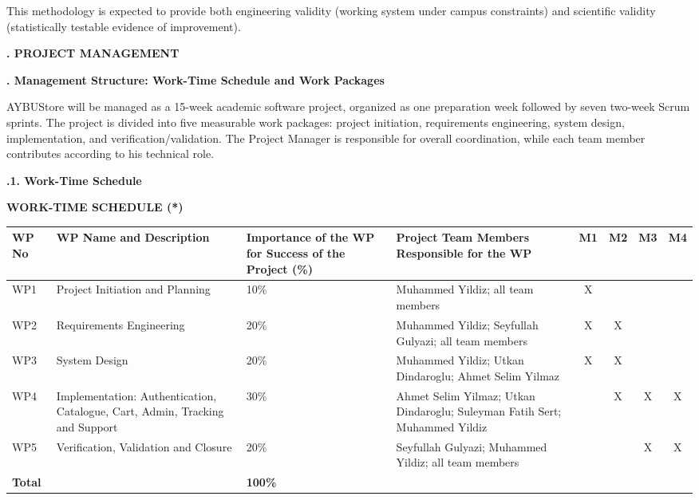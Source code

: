 \documentclass[10pt,a4paper]{article}
\newcommand{\sectionlabel}[1]{\vspace{1.2em}\noindent\textbf{\fontsize{10.5}{12}\selectfont #1}\par\vspace{0.4em}}
\newcommand{\subhead}[1]{\vspace{0.8em}\noindent\textbf{\fontsize{10}{11}\selectfont #1}\par\vspace{0.3em}}
\begin{document}
This methodology is expected to provide both engineering validity (working system under campus constraints) and scientific validity (statistically testable evidence of improvement).

\clearpage

\sectionlabel{3. PROJECT MANAGEMENT}

\subhead{3.1. Management Structure: Work-Time Schedule and Work Packages}

AYBUStore will be managed as a 15-week academic software project, organized as one preparation week followed by seven two-week Scrum sprints. The project is divided into five measurable work packages: project initiation, requirements engineering, system design, implementation, and verification/validation. The Project Manager is responsible for overall coordination, while each team member contributes according to his technical role.

\subhead{3.1.1. Work-Time Schedule}

\begin{center}
\textbf{WORK-TIME SCHEDULE (*)}
\end{center}

\scriptsize
\begin{tabularx}{\textwidth}{|P{0.07\textwidth}|P{0.23\textwidth}|P{0.13\textwidth}|P{0.27\textwidth}|C|C|C|C|}
\hline
\textbf{WP No} &
\textbf{WP Name and Description} &
\textbf{Importance of the WP for Success of the Project (\%)} &
\textbf{Project Team Members Responsible for the WP} &
\textbf{M1} &
\textbf{M2} &
\textbf{M3} &
\textbf{M4} \\ \hline
WP1 & Project Initiation and Planning & 10\% & Muhammed Yildiz; all team members & X & & & \\ \hline
WP2 & Requirements Engineering & 20\% & Muhammed Yildiz; Seyfullah Gulyazi; all team members & X & X & & \\ \hline
WP3 & System Design & 20\% & Muhammed Yildiz; Utkan Dindaroglu; Ahmet Selim Yilmaz & X & X & & \\ \hline
WP4 & Implementation: Authentication, Catalogue, Cart, Admin, Tracking and Support & 30\% & Ahmet Selim Yilmaz; Utkan Dindaroglu; Suleyman Fatih Sert; Muhammed Yildiz & & X & X & X \\ \hline
WP5 & Verification, Validation and Closure & 20\% & Seyfullah Gulyazi; Muhammed Yildiz; all team members & & & X & X \\ \hline
\textbf{Total} & & \textbf{100\%} & & & & & \\ \hline
\end{tabularx}
\end{document}
